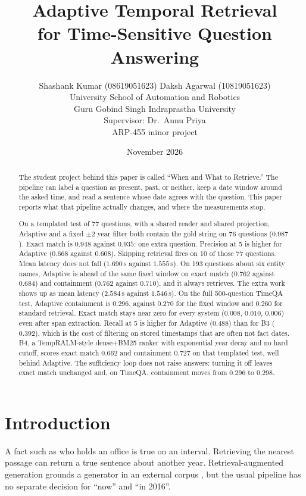 \documentclass[11pt]{article}
\title{Adaptive Temporal Retrieval\\
for Time-Sensitive Question Answering}
\author{
Shashank Kumar (08619051623) \quad Daksh Agarwal (10819051623)\\
University School of Automation and Robotics\\
Guru Gobind Singh Indraprastha University\\[0.35em]
{\normalsize Supervisor: Dr.\ Annu Priya}\\[0.15em]
{\normalsize ARP-455 minor project}
}
\date{November 2026}
\begin{document}
\maketitle

\begin{abstract}
The student project behind this paper is called ``When and What to Retrieve.''
The pipeline can label a question as present, past, or neither, keep a date window around the asked time, and read a sentence whose date agrees with the question.
This paper reports what that pipeline actually changes, and where the measurements stop.

On a templated test of 77 questions, with a shared reader and shared projection, Adaptive and a fixed $\pm 2$ year filter both contain the gold string on 76 questions ($0.987$).
Exact match is $0.948$ against $0.935$: one extra question.
Precision at 5 is higher for Adaptive ($0.668$ against $0.608$).
Skipping retrieval fires on 10 of those 77 questions.
Mean latency does not fall ($1.690$\,s against $1.555$\,s).
On 193 questions about six entity names, Adaptive is ahead of the same fixed window on exact match ($0.762$ against $0.684$) and containment ($0.762$ against $0.710$), and it always retrieves.
The extra work shows up as mean latency ($2.584$\,s against $1.546$\,s).
On the full 500-question TimeQA test, Adaptive containment is $0.296$, against $0.270$ for the fixed window and $0.260$ for standard retrieval.
Exact match stays near zero for every system ($0.008$, $0.010$, $0.006$) even after span extraction.
Recall at 5 is higher for Adaptive ($0.488$) than for B3 ($0.392$), which is the cost of filtering on stored timestamps that are often not fact dates.
B4, a TempRALM-style dense+BM25 ranker with exponential year decay and no hard cutoff, scores exact match $0.662$ and containment $0.727$ on that templated test, well behind Adaptive.
The sufficiency loop does not raise answers: turning it off leaves exact match unchanged and, on TimeQA, containment moves from $0.296$ to $0.298$.
\end{abstract}

\section{Introduction}
\label{sec:intro}

A fact such as who holds an office is true on an interval.
Retrieving the nearest passage can return a true sentence about another year.
Retrieval-augmented generation grounds a generator in an external corpus \cite{lewis2020rag}, but the usual pipeline has no separate decision for ``now'' and ``in 2016''.
\end{document}
